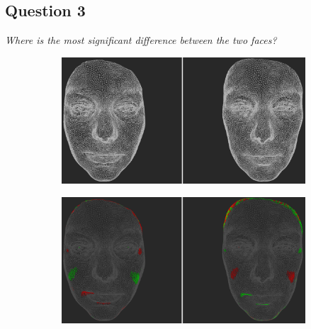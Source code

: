 \subsection{Question 3}
\label{attch:complete_study_results-question3}

\begin{center}{\it Where is the most significant difference between the two faces?}\end{center}

\begin{figure}[h]
\centering
\begin{subfigure}{0.49\textwidth}
\includegraphics[width=\textwidth]{./img-study/pair6.PNG}
\caption{}
\label{fig:study-2-6}
\end{subfigure}
\begin{subfigure}{0.49\textwidth}
\includegraphics[width=\textwidth]{./img-study/pair8.PNG}
\caption{}
\label{fig:study-2-8}
\end{subfigure}


\end{figure}
